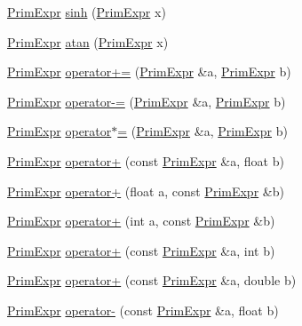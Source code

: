 \begin{DoxyCompactItemize}
\item 
\hyperlink{classtvm_1_1PrimExpr}{Prim\+Expr} \hyperlink{namespacetvm_a8c17ac9dc5cd2be44dd2c3ef23e0e4c9}{sinh} (\hyperlink{classtvm_1_1PrimExpr}{Prim\+Expr} x)
\item 
\hyperlink{classtvm_1_1PrimExpr}{Prim\+Expr} \hyperlink{namespacetvm_a0a4e38b4b6d9f7396f2eafa680f98bd8}{atan} (\hyperlink{classtvm_1_1PrimExpr}{Prim\+Expr} x)
\item 
\hyperlink{classtvm_1_1PrimExpr}{Prim\+Expr} \hyperlink{namespacetvm_a96061840d12f84eeecc8fae11e245242}{operator+=} (\hyperlink{classtvm_1_1PrimExpr}{Prim\+Expr} \&a, \hyperlink{classtvm_1_1PrimExpr}{Prim\+Expr} b)
\item 
\hyperlink{classtvm_1_1PrimExpr}{Prim\+Expr} \hyperlink{namespacetvm_a164d454c519fecaa5611c86b65469acc}{operator-\/=} (\hyperlink{classtvm_1_1PrimExpr}{Prim\+Expr} \&a, \hyperlink{classtvm_1_1PrimExpr}{Prim\+Expr} b)
\item 
\hyperlink{classtvm_1_1PrimExpr}{Prim\+Expr} \hyperlink{namespacetvm_a9233d7b436ae52ac070442ba19caed18}{operator$\ast$=} (\hyperlink{classtvm_1_1PrimExpr}{Prim\+Expr} \&a, \hyperlink{classtvm_1_1PrimExpr}{Prim\+Expr} b)
\item 
\hyperlink{classtvm_1_1PrimExpr}{Prim\+Expr} \hyperlink{namespacetvm_a2725c044e8067299c3dccbd453ce614f}{operator+} (const \hyperlink{classtvm_1_1PrimExpr}{Prim\+Expr} \&a, float b)
\item 
\hyperlink{classtvm_1_1PrimExpr}{Prim\+Expr} \hyperlink{namespacetvm_ac86d7f61b9f0899a08685145f6bb5051}{operator+} (float a, const \hyperlink{classtvm_1_1PrimExpr}{Prim\+Expr} \&b)
\item 
\hyperlink{classtvm_1_1PrimExpr}{Prim\+Expr} \hyperlink{namespacetvm_ad728a6c2c3d21242a4df808aadb722eb}{operator+} (int a, const \hyperlink{classtvm_1_1PrimExpr}{Prim\+Expr} \&b)
\item 
\hyperlink{classtvm_1_1PrimExpr}{Prim\+Expr} \hyperlink{namespacetvm_a50bfde26f015ed64e1c0341dd65d3fad}{operator+} (const \hyperlink{classtvm_1_1PrimExpr}{Prim\+Expr} \&a, int b)
\item 
\hyperlink{classtvm_1_1PrimExpr}{Prim\+Expr} \hyperlink{namespacetvm_ac225d9ad74343d0e97a5e943e7f6a7d1}{operator+} (const \hyperlink{classtvm_1_1PrimExpr}{Prim\+Expr} \&a, double b)
\item 
\hyperlink{classtvm_1_1PrimExpr}{Prim\+Expr} \hyperlink{namespacetvm_a679ff94dec26779d8769231abb229647}{operator-\/} (const \hyperlink{classtvm_1_1PrimExpr}{Prim\+Expr} \&a, float b)
\item 

\end{DoxyCompactItemize}
